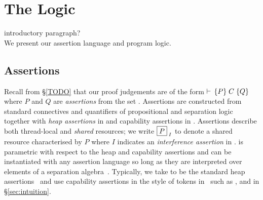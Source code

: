 \section{The \colosl Logic}\label{sec:logic}
\todo introductory paragraph?\\
We present our assertion language and program logic. 

\subsection{\colosl Assertions}
Recall from \S\ref{TODO} that our proof judgements are of the form
$\vdash\,\{P\}\;C\;\{Q\}$ where $P$ and $Q$ are \emph{assertions} from the set
\Assertions. Assertions are constructed from standard connectives and
quantifiers of propositional and separation logic together with
\emph{heap assertions} in \HAssertions and capability assertions in
\KAssertions. Assertions describe both thread-local and \emph{shared}
resources; we write $\boxed{P}_{\; I}$ to denote a shared resource
characterised by $P$ where $I$ indicates an \emph{interference
  assertion} in \IAssertions. \colosl is parametric with respect to
the heap and capability assertions and can be instantiated with any
assertion language so long as they are interpreted over elements of a
separation algebra~\cite{asl}. Typically, we take
\HAssertions to be the standard heap assertions~\cite{rey02} and
use capability assertions in the style of tokens in~\cite{todo}
such as ,  and  in \S\ref{sec:intuition}.
% 
